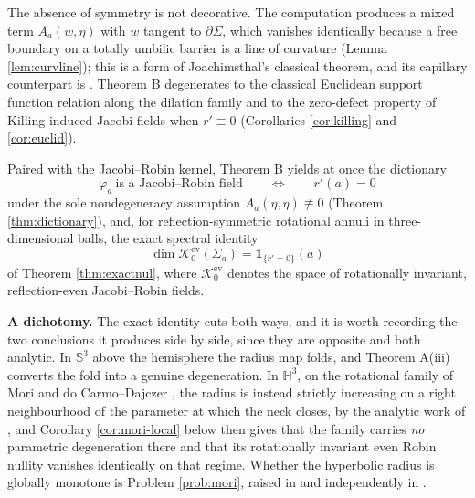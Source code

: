\documentclass[11pt,a4paper]{amsart}
\theoremstyle{plain}
\theoremstyle{definition}
\newcommand{\Sph}{\mathbb{S}}
\newcommand{\Hyp}{\mathbb{H}}
\newcommand{\Ker}{\mathcal{K}}
\begin{document}
The absence of symmetry is not decorative. The computation produces a mixed term $A_a(w,\eta)$ with $w$ tangent to $\partial\Sigma$, which vanishes identically because a free boundary on a totally umbilic barrier is a line of curvature (Lemma \ref{lem:curvline}); this is a form of Joachimsthal's classical theorem, and its capillary counterpart is \cite[Lem. 2.5]{NZ1}. Theorem B degenerates to the classical Euclidean support function relation along the dilation family and to the zero-defect property of Killing-induced Jacobi fields when $r'\equiv 0$ (Corollaries \ref{cor:killing} and \ref{cor:euclid}).

Paired with the Jacobi--Robin kernel, Theorem B yields at once the dictionary
\[
\varphi_a\ \text{is a Jacobi--Robin field}\qquad\Longleftrightarrow\qquad r'(a)=0
\]
under the sole nondegeneracy assumption $A_a(\eta,\eta)\not\equiv 0$ (Theorem \ref{thm:dictionary}), and, for reflection-symmetric rotational annuli in three-dimensional balls, the exact spectral identity
\[
\dim\Ker_0^{\mathrm{ev}}(\Sigma_a)=\mathbf{1}_{\{r'=0\}}(a)
\]
of Theorem \ref{thm:exactnul}, where $\Ker_0^{\mathrm{ev}}$ denotes the space of rotationally invariant, reflection-even Jacobi--Robin fields.

\medskip
\noindent\textbf{A dichotomy.} The exact identity cuts both ways, and it is worth recording the two conclusions it produces side by side, since they are opposite and both analytic. In $\Sph^3$ above the hemisphere the radius map folds, and Theorem A(iii) converts the fold into a genuine degeneration. In $\Hyp^3$, on the rotational family of Mori \cite{Mori81} and do Carmo--Dajczer \cite{dCD83}, the radius is instead strictly increasing on a right neighbourhood of the parameter at which the neck closes, by the analytic work of \cite{P1}, and Corollary \ref{cor:mori-local} below then gives that the family carries \emph{no} parametric degeneration there and that its rotationally invariant even Robin nullity vanishes identically on that regime. Whether the hyperbolic radius is globally monotone is Problem \ref{prob:mori}, raised in \cite[Rem.~4.3]{dO-thesis} and independently in \cite[Question 6.3]{P2}.
\end{document}
